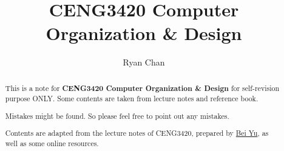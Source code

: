 \documentclass[a4paper]{report}
\author{Ryan Chan}
\title{CENG3420 Computer Organization \& Design}
\begin{document}
\setlength\parindent{0pt}

\maketitle

\newpage

\begin{abstract}
	This is a note for \textbf{CENG3420 Computer Organization \& Design} for self-revision purpose ONLY. Some contents are taken from lecture notes and reference book.
	
	Mistakes might be found. So please feel free to point out any mistakes.
	
	Contents are adapted from the lecture notes of CENG3420, prepared by \href{https://www.cse.cuhk.edu.hk/~byu/}{Bei Yu}, as well as some online resources. 
\end{abstract}

\newpage

\tableofcontents

\setlength{\parskip}{5pt}
\end{document}
